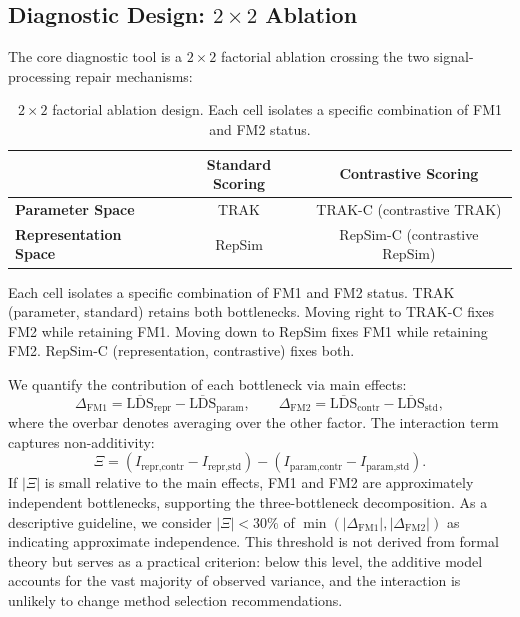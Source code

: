 \documentclass{article}
\begin{document}
\subsection{Diagnostic Design: $2 \times 2$ Ablation}
\label{sec:ablation}

The core diagnostic tool is a $2 \times 2$ factorial ablation crossing the two signal-processing repair mechanisms:

\begin{table}[t]
    \centering
    \caption{$2 \times 2$ factorial ablation design. Each cell isolates a specific combination of FM1 and FM2 status.}
    \label{tab:ablation_design}
    \small
    \begin{tabular}{lcc}
        \toprule
        & Standard Scoring & Contrastive Scoring \\
        \midrule
        \textbf{Parameter Space} & TRAK & TRAK-C (contrastive TRAK) \\
        \textbf{Representation Space} & RepSim & RepSim-C (contrastive RepSim) \\
        \bottomrule
    \end{tabular}
\end{table}

Each cell isolates a specific combination of FM1 and FM2 status. TRAK (parameter, standard) retains both bottlenecks. Moving right to TRAK-C fixes FM2 while retaining FM1. Moving down to RepSim fixes FM1 while retaining FM2. RepSim-C (representation, contrastive) fixes both.

We quantify the contribution of each bottleneck via main effects:
\begin{equation}
\Delta_\text{FM1} = \overline{\text{LDS}}_\text{repr} - \overline{\text{LDS}}_\text{param}, \qquad \Delta_\text{FM2} = \overline{\text{LDS}}_\text{contr} - \overline{\text{LDS}}_\text{std},
\label{eq:main_effects}
\end{equation}
where the overbar denotes averaging over the other factor. The interaction term captures non-additivity:
\begin{equation}
\Xi = (I_\text{repr,contr} - I_\text{repr,std}) - (I_\text{param,contr} - I_\text{param,std}).
\label{eq:interaction}
\end{equation}
If $|\Xi|$ is small relative to the main effects, FM1 and FM2 are approximately independent bottlenecks, supporting the three-bottleneck decomposition. As a descriptive guideline, we consider $|\Xi| < 30\%$ of $\min(|\Delta_\text{FM1}|, |\Delta_\text{FM2}|)$ as indicating approximate independence. This threshold is not derived from formal theory but serves as a practical criterion: below this level, the additive model accounts for the vast majority of observed variance, and the interaction is unlikely to change method selection recommendations.
\end{document}
